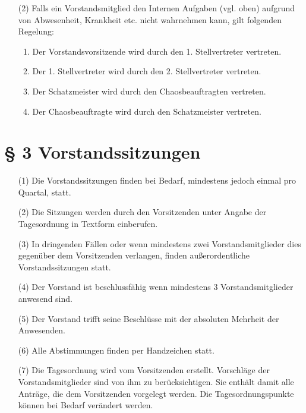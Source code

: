 \documentclass[a4paper,12pt]{scrartcl}
\begin{document}
\begin{enumerate}
\begin{enumerate}
\end{enumerate}

\item[(2)]
Falls ein Vorstandsmitglied den Internen Aufgaben (vgl. oben) aufgrund von Abwesenheit, Krankheit etc. nicht wahrnehmen kann, gilt folgenden Regelung:
\begin{enumerate}
\item Der Vorstandsvorsitzende wird durch den 1. Stellvertreter vertreten.
\item Der 1. Stellvertreter wird durch den 2. Stellvertreter vertreten.
\item Der Schatzmeister wird durch den Chaosbeauftragten vertreten.
\item Der Chaosbeauftragte wird durch den Schatzmeister vertreten.
\end{enumerate}

\end{enumerate}

\section*{\S{} 3 Vorstandssitzungen}
\begin{enumerate}
\item[(1)]
Die Vorstandssitzungen finden bei Bedarf, mindestens jedoch einmal pro Quartal, statt.
\item[(2)]
Die Sitzungen werden durch den Vorsitzenden unter Angabe der Tagesordnung in
Textform einberufen.
\item[(3)]
In dringenden Fällen oder wenn mindestens zwei Vorstandsmitglieder dies gegenüber
dem Vorsitzenden verlangen, finden außerordentliche Vorstandssitzungen statt.
\item[(4)]
Der Vorstand ist beschlussfähig wenn mindestens 3 Vorstandsmitglieder anwesend
sind.
\item[(5)]
Der Vorstand trifft seine Beschlüsse mit der absoluten Mehrheit der Anwesenden.
\item[(6)]
Alle Abstimmungen finden per Handzeichen statt.
\item[(7)]
Die Tagesordnung wird vom Vorsitzenden erstellt. Vorschläge der Vorstandsmitglieder
sind von ihm zu berücksichtigen. Sie enthält damit alle Anträge, die dem Vorsitzenden
vorgelegt werden. Die Tagesordnungspunkte können bei Bedarf verändert werden.


\end{enumerate}
\end{document}
